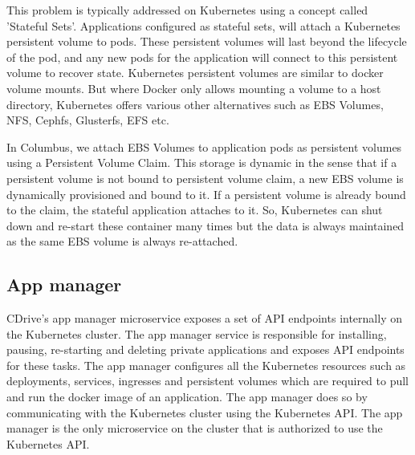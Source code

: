 This problem is typically addressed on Kubernetes using a concept called 'Stateful Sets'.  
Applications configured as stateful sets, will attach a Kubernetes persistent volume to pods. 
These persistent volumes will last beyond the lifecycle of the pod, and any new pods for the 
application will connect to this persistent volume to recover state. Kubernetes persistent volumes 
are similar to docker volume mounts. But where Docker only allows mounting a volume to a host 
directory, Kubernetes offers various other alternatives such as EBS Volumes, NFS, Cephfs, Glusterfs,
EFS etc.


In Columbus, we attach EBS Volumes to application pods as persistent volumes using a Persistent 
Volume Claim. This storage is dynamic in the sense that if a persistent volume is not bound to 
persistent volume claim, a new EBS volume is dynamically provisioned and bound to it. If a 
persistent volume is already bound to the claim, the stateful application attaches to it. So, 
Kubernetes can shut down and re-start these container many times but the data is always maintained 
as the same EBS volume is always re-attached.

\subsection{App manager}
CDrive's app manager microservice exposes a set of API endpoints internally on the Kubernetes
cluster. The app manager service is responsible for installing, pausing, re-starting and deleting 
private applications and exposes API endpoints for these tasks. The app manager configures all the
Kubernetes resources such as deployments, services, ingresses and persistent volumes which are 
required to pull and run the docker image of an application. The app manager does so by 
communicating with the Kubernetes cluster using the Kubernetes API. The app manager is the only 
microservice on the cluster that is authorized to use the Kubernetes API.
